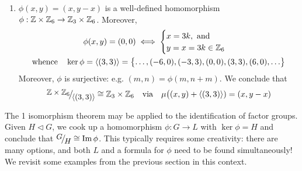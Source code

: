 \begin{examples}{}{}
\begin{enumerate}
  \item $\phi(x,y)=(x,y-x)$ is a well-defined homomorphism $\phi:\mathbb{Z}\times\mathbb{Z}_6\to\mathbb{Z}_3\times\mathbb{Z}_6$. Moreover,
  \begin{gather*}
  	\phi(x,y)=(0,0)\iff
  	\begin{cases}
  		x=3k,\text{ and}\\
  		y=x=3k\in\mathbb{Z}_6
  	\end{cases}\\
  	\text{whence}\quad
  	\ker\phi=\left\langle (3,3)\right\rangle=\bigl\{\ldots,(-6,0),(-3,3),(0,0),(3,3),(6,0),\ldots\bigr\}
  \end{gather*}
  Moreover, $\phi$ is surjective: e.g. $(m,n)=\phi(m,n+m)$. We conclude that
	\[
		\quotient{\Z\times\Z_6}{\ip{(3,3)}}\cong\Z_3\times\Z_6
		\quad\text{via}\quad
		\mu\bigl((x,y)+\ip{(3,3)})=(x,y-x)
	\]
	\end{enumerate}
\end{examples}

\vfil

\goodbreak


The 1\st{} isomorphism theorem may be applied to the identification of factor groups. Given $H\triangleleft G$, we cook up a homomorphism $\phi:G\to L$ with $\ker\phi=H$ and conclude that $\quotient GH\cong\image\phi$. This typically requires some creativity: there are many options, and both $L$ and a formula for $\phi$ need to be found simultaneously! We revisit some examples from the previous section in this context.

